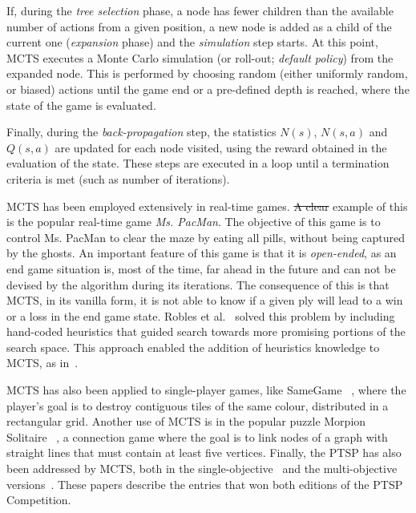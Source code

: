 \documentclass[journal]{IEEEtran}
\providecommand{\DIFaddtex}[1]{{\protect\color{blue}\uwave{#1}}} %
\providecommand{\DIFdeltex}[1]{{\protect\color{red}\sout{#1}}}                      %
\providecommand{\DIFaddbegin}{} %
\providecommand{\DIFaddend}{} %
\providecommand{\DIFdelbegin}{} %
\providecommand{\DIFdelend}{} %
\providecommand{\DIFadd}[1]{\texorpdfstring{\DIFaddtex{#1}}{#1}} %
\providecommand{\DIFdel}[1]{\texorpdfstring{\DIFdeltex{#1}}{}} %
\begin{document}
If, during the \textit{tree selection} phase, a node has fewer children than the available number of actions from a given position, a new node is added as a child of the current one (\textit{expansion} phase) and the \textit{simulation} step starts. At this point, MCTS executes a Monte Carlo simulation (or roll-out; \textit{default policy}) from the expanded node. This is performed by choosing random (either uniformly random, or biased) actions until the game end or a pre-defined depth is reached, where the state of the game is evaluated. 

Finally, during the \textit{back-propagation} step, the statistics $N(s)$, $N(s,a)$ and $Q(s,a)$ are updated for each node visited, using the reward obtained in the evaluation of the state. These steps are executed in a loop until a termination criteria is met (such as number of iterations).


MCTS has been employed extensively in real-time games. \DIFdelbegin \DIFdel{A clear }\DIFdelend \DIFaddbegin \DIFadd{An }\DIFaddend example of this is the popular real-time game \textit{Ms. PacMan}. The objective of this game is to control Ms. PacMan to clear the maze by eating all pills, without being captured by the ghosts. An important feature of this game is that it is \textit{open-ended}, as an end game situation is, most of the time, far ahead in the future and can not be devised by the algorithm during its iterations. The consequence of this is that MCTS, in its vanilla form, it is not able to know if a given ply will lead to a win or a loss in the end game state. Robles et al.~\cite{Robles2009} solved this problem by including hand-coded heuristics that guided search towards more promising portions of the search space. This approach enabled the addition of heuristics knowledge to MCTS, as in~\cite{Samothrakis, Ikehata2010}.

MCTS has also been applied to single-player games, like SameGame~\DIFdelbegin %
\DIFdelend \DIFaddbegin \cite{Schadd2008}\DIFaddend , where the player's goal is to destroy contiguous tiles of the same colour, distributed in a rectangular grid. Another use of MCTS is in the popular puzzle Morpion Solitaire~\DIFdelbegin %
\DIFdelend \DIFaddbegin \cite{Cazenave2007}\DIFaddend , a connection game where the goal is to link nodes of a graph with straight lines that must contain at least five vertices. Finally, the PTSP has also been addressed by MCTS, both in the single-objective~\cite{Perez2013, Powley2012} and the multi-objective versions~\cite{Powley2013}. These papers describe the entries that won both editions of the PTSP Competition.
\end{document}
